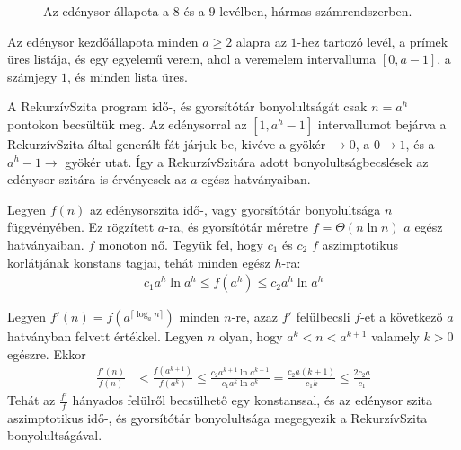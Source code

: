 \documentclass[12pt]{report}
\begin{document}
\begin{figure}[ht]
\caption{Az edénysor állapota a $8$ és a $9$ levélben, hármas számrendszerben.}
\label{fig:BQ389}
\end{figure}

Az edénysor kezdőállapota minden $a \ge 2$ alapra
az $1$-hez tartozó levél, a prímek üres listája,
és egy egyelemű verem, ahol a veremelem intervalluma $[0, a-1]$,
a számjegy $1$, és minden lista üres.

A RekurzívSzita program idő-, és gyorsítótár bonyolultságát
csak $n=a^h$ pontokon becsültük meg.
Az edénysorral az $[1, a^h-1]$ intervallumot bejárva
a RekurzívSzita által generált fát járjuk be,
kivéve a gyökér $\rightarrow 0$, a $0 \rightarrow 1$,
és a $a^h-1 \rightarrow$ gyökér utat.
Így a RekurzívSzitára adott bonyolultságbecslések
az edénysor szitára is érvényesek az $a$ egész hatványaiban.

Legyen $f(n)$ az edénysorszita idő-, vagy gyorsítótár bonyolultsága
$n$ függvényében. Ez rögzített $a$-ra, és gyorsítótár méretre
$f = \Theta(n \ln{n})$ $a$ egész hatványaiban.
$f$ monoton nő.
Tegyük fel, hogy $c_1$ és $c_2$ $f$ aszimptotikus korlátjának konstans tagjai,
tehát minden egész $h$-ra:
\begin{align*}
c_1 a^h \ln{a^h} \le f(a^h) \le c_2 a^h \ln{a^h}
\end{align*}

Legyen $f'(n) = f(a^{\lceil \log_{a}{n} \rceil})$ minden $n$-re,
azaz $f'$ felülbecsli $f$-et a következő $a$ hatványban felvett értékkel.
Legyen $n$ olyan, hogy $a^k < n < a^{k+1}$ valamely $k > 0$ egészre.
Ekkor
\begin{align*}
\frac{f'(n)}{f(n)}
&< \frac{f(a^{k+1})}{f(a^k)}
\le \frac{c_2 a^{k+1} \ln{a^{k+1}}}{c_1 a^k \ln{a^k}}
= \frac{c_2 a (k+1)}{c_1 k}
\le \frac{2 c_2 a }{c_1}
\end{align*}
Tehát az $\frac{f'}{f}$ hányados felülről becsülhető egy konstanssal,
és az edénysor szita aszimptotikus idő-, és gyorsítótár bonyolultsága
megegyezik a RekurzívSzita bonyolultságával.
\end{document}
